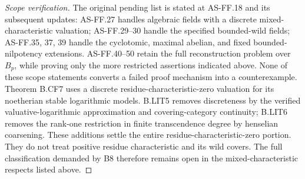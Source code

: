 \begin{proof}[Scope verification]
The original pending list is stated at AS-FF.18 and its subsequent
updates: AS-FF.27 handles algebraic fields with a discrete
mixed-characteristic valuation; AS-FF.29--30 handle the specified
bounded-wild fields; AS-FF.35, 37, 39 handle the cyclotomic, maximal
abelian, and fixed bounded-nilpotency extensions. AS-FF.40--50 retain
the full reconstruction problem over \(B_p\), while proving only the
more restricted assertions indicated above. None of these scope
statements converts a failed proof mechanism into a counterexample.
Theorem B.CF7 uses a discrete residue-characteristic-zero valuation
for its noetherian stable logarithmic models. B.LIT5 removes
discreteness by the verified valuative-logarithmic approximation
and covering-category continuity; B.LIT6 removes the rank-one
restriction in finite transcendence degree by henselian coarsening.
These additions settle the entire residue-characteristic-zero
portion. They do not treat positive residue characteristic and
its wild covers. The full classification demanded by B8 therefore
remains open in the mixed-characteristic respects listed above.
\end{proof}

